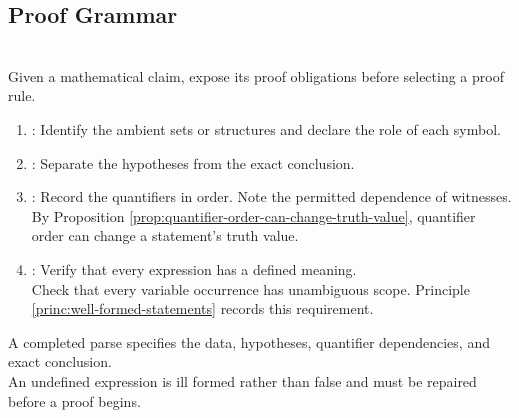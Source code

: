 \subsection{Proof Grammar}

\begin{proofmethod} \label{meth:proof-grammar} \\
Given a mathematical claim, expose its proof obligations before selecting a proof rule.
\begin{enumerate}[label=(\roman*)]
\setlength{\itemsep}{0pt}
\item {}: Identify the ambient sets or structures and declare the role of each symbol.
\item {}: Separate the hypotheses from the exact conclusion.
\item {}: Record the quantifiers in order. Note the permitted dependence of witnesses.\\
By Proposition \ref{prop:quantifier-order-can-change-truth-value}, quantifier order can change a statement's truth value.
\item {}: Verify that every expression has a defined meaning.\\
Check that every variable occurrence has unambiguous scope. Principle \ref{princ:well-formed-statements} records this requirement.
\end{enumerate}
A completed parse specifies the data, hypotheses, quantifier dependencies, and exact conclusion.\\
An undefined expression is ill formed rather than false and must be repaired before a proof begins.
\end{proofmethod}
